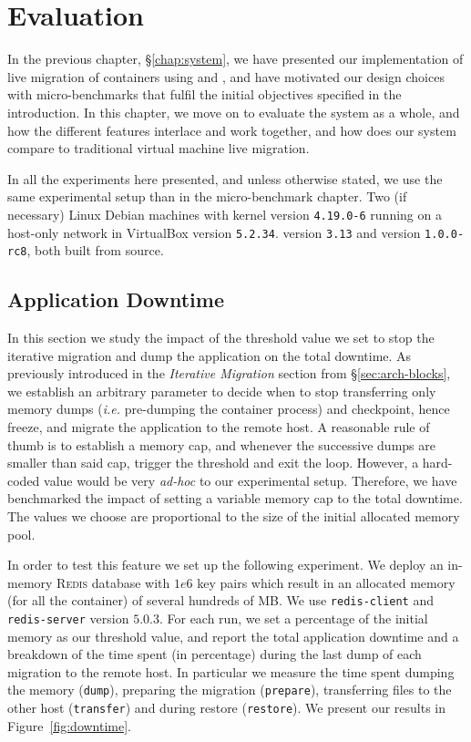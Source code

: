 \chapter{Evaluation} \label{chap:evaluation}

In the previous chapter, \S\ref{chap:system}, we have presented our
implementation of live migration of containers using \criu and \runc, and have
motivated our design choices with micro-benchmarks that fulfil the initial
objectives specified in the introduction.
In this chapter, we move on to evaluate the system as a whole, and how the
different features interlace and work together, and  how does our system
compare to traditional virtual machine live migration.

In all the experiments here presented, and unless otherwise stated, we use the
same experimental setup than in the micro-benchmark chapter.
Two (if necessary) Linux Debian machines with kernel version \texttt{4.19.0-6}
running on a host-only network in VirtualBox version \texttt{5.2.34}.
\criu version \texttt{3.13} and \runc version \texttt{1.0.0-rc8}, both built
from source.

\section{Application Downtime} \label{sec:eval-downtime}

In this section we study the impact of the threshold value we set to stop the
iterative migration and dump the application on the total downtime.
As previously introduced in the \textit{Iterative Migration} section from
\S\ref{sec:arch-blocks}, we establish an arbitrary parameter to decide when to
stop transferring only memory dumps (\textit{i.e.} pre-dumping the container
process) and checkpoint, hence freeze, and migrate the application to the
remote host.
A reasonable rule of thumb is to establish a memory cap, and whenever the
successive dumps are smaller than said cap, trigger the threshold and exit the
loop.
However, a hard-coded value would be very \textit{ad-hoc} to our experimental
setup.
Therefore, we have benchmarked the impact of setting a variable memory cap to
the total downtime.
The values we choose are proportional to the size of the initial allocated
memory pool.

In order to test this feature we set up the following experiment.
We deploy an in-memory \textsc{Redis} database with $1e6$ key pairs which
result in an allocated memory (for all the container) of several hundreds of
MB.
We use \texttt{redis-client} and \texttt{redis-server} version $5.0.3$.
For each run, we set a percentage of the initial memory as our threshold value,
and report the total application downtime and a breakdown of the time spent (in
percentage) during the last dump of each migration to the remote host.
In particular we measure the time spent dumping the memory (\texttt{dump}),
preparing the migration (\texttt{prepare}), transferring files to the other
host (\texttt{transfer}) and during restore (\texttt{restore}).
We present our results in Figure~\ref{fig:downtime}.

